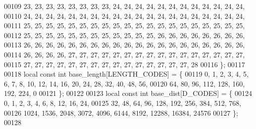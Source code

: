 \begin{DoxyCode}
00109 23, 23, 23, 23, 23, 23, 23, 23, 24, 24, 24, 24, 24, 24, 24, 24, 24, 24, 24, 24,
00110 24, 24, 24, 24, 24, 24, 24, 24, 24, 24, 24, 24, 24, 24, 24, 24, 24, 24, 24, 24,
00111 25, 25, 25, 25, 25, 25, 25, 25, 25, 25, 25, 25, 25, 25, 25, 25, 25, 25, 25, 25,
00112 25, 25, 25, 25, 25, 25, 25, 25, 25, 25, 25, 25, 26, 26, 26, 26, 26, 26, 26, 26,
00113 26, 26, 26, 26, 26, 26, 26, 26, 26, 26, 26, 26, 26, 26, 26, 26, 26, 26, 26, 26,
00114 26, 26, 26, 26, 27, 27, 27, 27, 27, 27, 27, 27, 27, 27, 27, 27, 27, 27, 27, 27,
00115 27, 27, 27, 27, 27, 27, 27, 27, 27, 27, 27, 27, 27, 27, 27, 28
00116 \};
00117 
00118 local \textcolor{keyword}{const} \textcolor{keywordtype}{int} base\_length[LENGTH\_CODES] = \{
00119 0, 1, 2, 3, 4, 5, 6, 7, 8, 10, 12, 14, 16, 20, 24, 28, 32, 40, 48, 56,
00120 64, 80, 96, 112, 128, 160, 192, 224, 0
00121 \};
00122 
00123 local \textcolor{keyword}{const} \textcolor{keywordtype}{int} base\_dist[D\_CODES] = \{
00124     0,     1,     2,     3,     4,     6,     8,    12,    16,    24,
00125    32,    48,    64,    96,   128,   192,   256,   384,   512,   768,
00126  1024,  1536,  2048,  3072,  4096,  6144,  8192, 12288, 16384, 24576
00127 \};
00128 
\end{DoxyCode}
